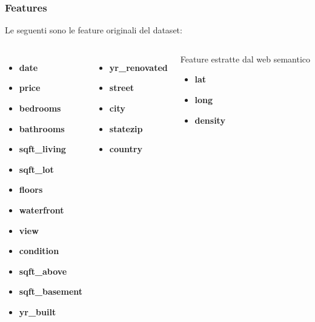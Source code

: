 \documentclass{beamer}
\begin{document}
\begin{frame}
	\frametitle{Features}
	Le seguenti sono le feature originali del dataset:
	\begin{columns}
		\begin{itemize}
			\itemsep0em
			\item \textbf{date}
			\item \textbf{price}
			\item \textbf{bedrooms}
			\item \textbf{bathrooms}
			\item \textbf{sqft\_living}
			\item \textbf{sqft\_lot}
			\item \textbf{floors}
			\item \textbf{waterfront}
			\item \textbf{view}
			\item \textbf{condition}
			\item \textbf{sqft\_above}
			\item \textbf{sqft\_basement}
			\item \textbf{yr\_built}
		\end{itemize}
		\begin{itemize}
			\item \textbf{yr\_renovated}
			\item \textbf{street}
			\item \textbf{city}
			\item \textbf{statezip}
			\item \textbf{country}
		\end{itemize}
		\begin{alertblock}{Feature estratte dal web semantico}
			\begin{itemize}
				\item \textbf{lat}
				\item \textbf{long}
				\item \textbf{density}
			\end{itemize}
		\end{alertblock}
	\end{columns}
\end{frame}
\end{document}
